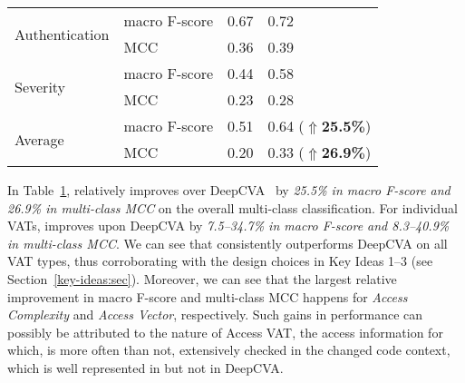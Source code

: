 \begin{table}[t]
\begin{center}
\begin{tabular}{l|p{1.9cm}<{\centering}|p{1.6cm}<{\centering}|p{1.5cm}<{\centering}}
			\hline
			\multirow{2}{*}{Authentication}  & macro F-score                             &   0.67         & 0.72\\
			\cline{2-4}
			                                 & MCC                                 &   0.36         & 0.39\\
			\hline
			\multirow{2}{*}{Severity}        & macro F-score                             &   0.44         & 0.58\\
			\cline{2-4}
			                                 & MCC                                 &   0.23         & 0.28\\
			\hline
			\hline
			\multirow{2}{*}{Average}         & macro F-score                             &    0.51        & 0.64 ($\Uparrow${\bf 25.5\%})\\
			\cline{2-4}
			                                 & MCC                                 & 0.20           & 0.33 ($\Uparrow${\bf 26.9\%})\\
            \hline
		\end{tabular}
		\label{rq1_results}
	\end{center}
\end{table}

In Table~\ref{rq1_results}, {\tool} relatively improves over DeepCVA~\cite{deepCVA-ase21} by {\em 25.5\% in macro F-score and
26.9\% in multi-class MCC} on the overall multi-class classification. For individual VATs, {\tool} improves upon DeepCVA by {\em 7.5--34.7\% in macro F-score and 8.3--40.9\% in multi-class MCC}. We can see that {\tool} consistently outperforms DeepCVA on all VAT types, thus corroborating with the design choices in Key Ideas 1--3 (see Section~\ref{key-ideas:sec}). Moreover, we can see that the largest relative improvement in macro F-score and multi-class MCC happens for {\em Access Complexity} and {\em Access Vector}, respectively. Such gains in performance can possibly be attributed to the nature of Access VAT, the access information for which, is more often than not, extensively checked in the changed code context, which is well represented in {\tool} but not in DeepCVA.



